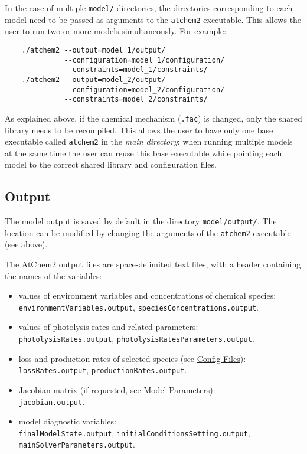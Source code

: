 In the case of multiple \texttt{model/} directories, the directories
corresponding to each model need to be passed as arguments to the
\texttt{atchem2} executable. This allows the user to run two or more
models simultaneously. For example:

\begin{verbatim}
    ./atchem2 --output=model_1/output/
              --configuration=model_1/configuration/
              --constraints=model_1/constraints/
    ./atchem2 --output=model_2/output/
              --configuration=model_2/configuration/
              --constraints=model_2/constraints/
\end{verbatim}

As explained above, if the chemical mechanism (\texttt{.fac}) is
changed, only the shared library needs to be recompiled. This allows
the user to have only one base executable called \texttt{atchem2} in
the \emph{main directory}: when running multiple models at the same
time the user can reuse this base executable while pointing each model
to the correct shared library and configuration files.

\subsection{Output} \label{subsec:output}

The model output is saved by default in the directory
\texttt{model/output/}. The location can be modified by changing the
arguments of the \texttt{atchem2} executable (see above).

The AtChem2 output files are space-delimited text files, with a header
containing the names of the variables:

\begin{itemize}
\item values of environment variables and concentrations of chemical
  species:\\ \texttt{environmentVariables.output},
  \texttt{speciesConcentrations.output}.
\item values of photolysis rates and related parameters:\\
  \texttt{photolysisRates.output},
  \texttt{photolysisRatesParameters.output}.
\item loss and production rates of selected species (see
  \hyperref[sec:config]{Config Files}):\\ \texttt{lossRates.output},
  \texttt{productionRates.output}.
\item Jacobian matrix (if requested, see
  \hyperref[sec:parameters]{Model Parameters}):\\
  \texttt{jacobian.output}.
\item model diagnostic variables:\\ \texttt{finalModelState.output},
  \texttt{initialConditionsSetting.output},
  \texttt{mainSolverParameters.output}.
\end{itemize}

